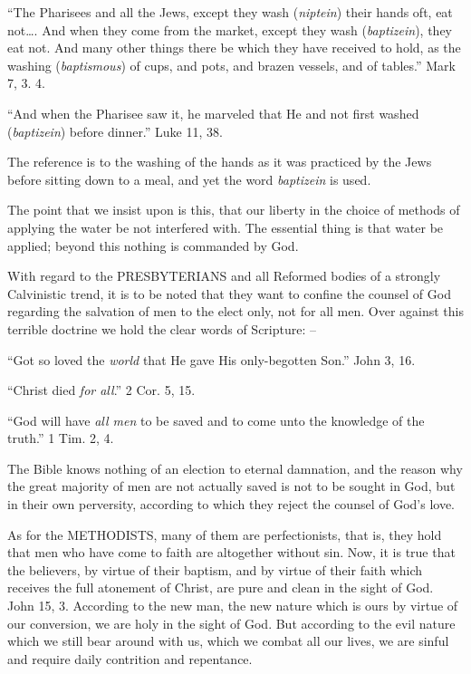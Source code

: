 \documentclass[
]{book}
\begin{document}
``The Pharisees and all the Jews, except they wash (\emph{niptein}) their hands oft, eat not\ldots. And when they come from the market, except they wash (\emph{baptizein}), they eat not. And many other things there be which they have received to hold, as the washing (\emph{baptismous}) of cups, and pots, and brazen vessels, and of tables.'' Mark 7, 3. 4.

``And when the Pharisee saw it, he marveled that He and not first washed (\emph{baptizein}) before dinner.'' Luke 11, 38.

The reference is to the washing of the hands as it was practiced by the Jews before sitting down to a meal, and yet the word \emph{baptizein} is used.

The point that we insist upon is this, that our liberty in the choice of methods of applying the water be not interfered with. The essential thing is that water be applied; beyond this nothing is commanded by God.

With regard to the PRESBYTERIANS and all Reformed bodies of a strongly Calvinistic trend, it is to be noted that they want to confine the counsel of God regarding the salvation of men to the elect only, not for all men. Over against this terrible doctrine we hold the clear words of Scripture: --

``Got so loved the \emph{world} that He gave His only-begotten Son.'' John 3, 16.

``Christ died \emph{for all}.'' 2 Cor. 5, 15.

``God will have \emph{all men} to be saved and to come unto the knowledge of the truth.'' 1 Tim. 2, 4.

The Bible knows nothing of an election to eternal damnation, and the reason why the great majority of men are not actually saved is not to be sought in God, but in their own perversity, according to which they reject the counsel of God's love.

As for the METHODISTS, many of them are perfectionists, that is, they hold that men who have come to faith are altogether without sin. Now, it is true that the believers, by virtue of their baptism, and by virtue of their faith which receives the full atonement of Christ, are pure and clean in the sight of God. John 15, 3. According to the new man, the new nature which is ours by virtue of our conversion, we are holy in the sight of God. But according to the evil nature which we still bear around with us, which we combat all our lives, we are sinful and require daily contrition and repentance.
\end{document}
